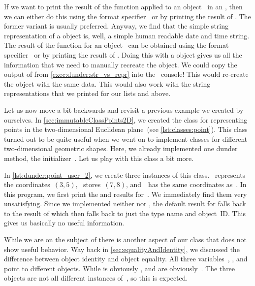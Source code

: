 If we want to print the result of the  function applied to an object~ in an , then we can either do this using the format specifier~ or by printing the result of .
The former variant is usually preferred.
Anyway, we find that the simple string representation of a  object is, well, a simple human readable date and time string.
The result of the function  for an object~ can be obtained using the format specifier~ or by printing the result of .
Doing this with a  object gives us all the information that we need to manually recreate the object.
We could copy the output of  from \cref{exec:dunder:str_vs_repr} into the \python\ console!
This would re-create the  object with the same data.
This would also work with the string representations that we printed for our lists  and  above.

%
%
%
Let us now move a bit backwards and revisit a previous example we created by ourselves.
In \cref{sec:immutableClassPoints2D}, we created the class  for representing points in the two-dimensional Euclidean plane~(see \cref{lst:classes:point}).
This class turned out to be quite useful when we went on to implement classes for different two-dimensional geometric shapes.
Here, we already implemented one dunder method, the initializer~.
Let us play with this class a bit more.

In \cref{lst:dunder:point_user_2}, we create three instances of this class.
~represents the coordinates~$(3,5)$, ~stores~$(7, 8)$, and~~has the same coordinates as~.
In this program, we first print the  and  results for~.
We immediately find them very unsatisfying.
Since we implemented neither  nor , the default result for  falls back to the result of  which then falls back to just the type name and object~ID.
This gives us basically no useful information.

While we are on the subject of  there is another aspect of our  class that does not show useful behavior.
Way back in \cref{sec:equalityAndIdentity}, we discussed the difference between object identity and object equality.
All three variables~, , and~ point to different objects.
While  is obviously ,  and  are obviously~.
The three objects are not all different instances of~, so this is expected.

